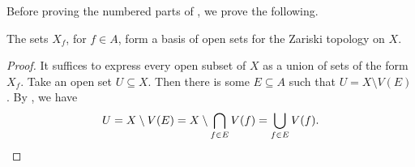 Before proving the numbered parts of , we prove the following.

\begin{claim}
The sets \(X_f\), for \(f \in A\), form a basis of open sets for the Zariski topology on \(X\).
\end{claim}

\begin{proof}
It suffices to express every open subset of \(X\) as a union of sets of the form \(X_f\).
Take an open set \(U \subseteq X\).
Then there is some \(E \subseteq A\) such that \(U = X \setminus V(E)\).
By , we have
\begin{equation*}
U
= X \setminus V(E)
= X \setminus \bigcap_{f \in E} V(f)
= \bigcup_{f \in E} V(f).
\qedhere
\end{equation*}
\end{proof}